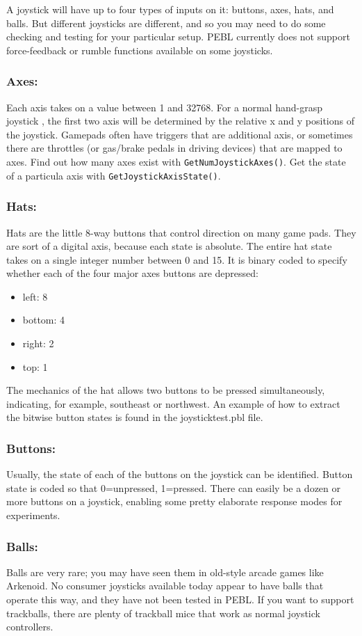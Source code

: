 A joystick will have up to four types of inputs on it: buttons, axes, hats, and balls.  But different joysticks are different, and so you may need to do some checking and testing for your particular setup.  PEBL currently does not support force-feedback or rumble functions available on some joysticks.

\subsubsection{Axes:} 
Each axis takes on a value between 1 and 32768. For a  normal hand-grasp joystick , the first two axis will be determined by the relative x and y positions of the joystick.  Gamepads often have triggers that are additional axis, or sometimes there are throttles (or gas/brake pedals in driving devices) that are mapped to axes.
Find out how many axes exist with \texttt{GetNumJoystickAxes()}.  Get the state of a particula axis with \texttt{GetJoystickAxisState()}.  


\subsubsection{Hats:}
  Hats are the little 8-way buttons that control direction on many game pads.  They are sort of a digital axis, because each state is absolute.  The entire hat state takes on a single integer number between 0 and 15.  It is binary coded to specify whether each of the four major axes buttons are depressed:
\begin{itemize}
\item left: 8
\item bottom: 4
\item right: 2
\item top: 1
\end{itemize}
The mechanics of the hat allows two buttons to be pressed simultaneously, indicating, for example, southeast or northwest.  An example of how to extract the bitwise button states is found in the joysticktest.pbl file.

\subsubsection{Buttons:}
  Usually, the state of each of the buttons on the joystick can be identified.  Button state is coded so that 0=unpressed, 1=pressed.  There  can easily be a dozen or more buttons on a joystick, enabling some pretty elaborate response modes for experiments.

\subsubsection{Balls:} 
Balls are very rare; you may have seen them in old-style arcade games like Arkenoid.   No consumer joysticks available today appear to have balls that operate this way, and they have not been tested in PEBL.  If you want to support trackballs, there are plenty of trackball mice that work as normal joystick controllers.

